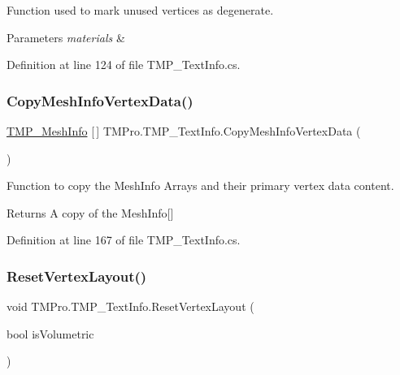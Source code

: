 Function used to mark unused vertices as degenerate. 


\begin{DoxyParams}{Parameters}
{\em materials} & \\
\hline
\end{DoxyParams}


Definition at line 124 of file T\+M\+P\+\_\+\+Text\+Info.\+cs.

\mbox{\label{class_t_m_pro_1_1_t_m_p___text_info_a665aff73b3e4eceb0198f198ae831a81}} 
\subsubsection{\texorpdfstring{CopyMeshInfoVertexData()}{CopyMeshInfoVertexData()}}
{\footnotesize\ttfamily \mbox{\hyperlink{struct_t_m_pro_1_1_t_m_p___mesh_info}{T\+M\+P\+\_\+\+Mesh\+Info}} \mbox{[}$\,$\mbox{]} T\+M\+Pro.\+T\+M\+P\+\_\+\+Text\+Info.\+Copy\+Mesh\+Info\+Vertex\+Data (\begin{DoxyParamCaption}{ }\end{DoxyParamCaption})}



Function to copy the Mesh\+Info Arrays and their primary vertex data content. 

\begin{DoxyReturn}{Returns}
A copy of the Mesh\+Info\mbox{[}\mbox{]}
\end{DoxyReturn}


Definition at line 167 of file T\+M\+P\+\_\+\+Text\+Info.\+cs.

\mbox{\label{class_t_m_pro_1_1_t_m_p___text_info_a62fb378fdbe5f9cce0ac975968e4fe21}} 
\subsubsection{\texorpdfstring{ResetVertexLayout()}{ResetVertexLayout()}}
{\footnotesize\ttfamily void T\+M\+Pro.\+T\+M\+P\+\_\+\+Text\+Info.\+Reset\+Vertex\+Layout (\begin{DoxyParamCaption}\item[{bool}]{is\+Volumetric }\end{DoxyParamCaption})}







